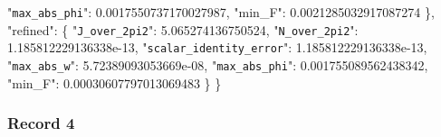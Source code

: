 \documentclass[
  10pt,
]{article}
\newenvironment{Shaded}{}{}
\newcommand{\DataTypeTok}[1]{\textcolor[rgb]{0.56,0.13,0.00}{#1}}
\newcommand{\FloatTok}[1]{\textcolor[rgb]{0.25,0.63,0.44}{#1}}
\newcommand{\FunctionTok}[1]{\textcolor[rgb]{0.02,0.16,0.49}{#1}}
\begin{document}
\begin{Shaded}
\begin{Highlighting}[]
    \DataTypeTok{"\nolinkurl{max_abs_phi}"}\FunctionTok{:} \FloatTok{0.0017550737170027987}\FunctionTok{,}
    \DataTypeTok{"min\_F"}\FunctionTok{:} \FloatTok{0.0021285032917087274}
  \FunctionTok{\},}
  \DataTypeTok{"refined"}\FunctionTok{:} \FunctionTok{\{}
    \DataTypeTok{"\nolinkurl{J_over_2pi2}"}\FunctionTok{:} \FloatTok{5.065274136750524}\FunctionTok{,}
    \DataTypeTok{"\nolinkurl{N_over_2pi2}"}\FunctionTok{:} \FloatTok{1.185812229136338e{-}13}\FunctionTok{,}
    \DataTypeTok{"\nolinkurl{scalar_identity_error}"}\FunctionTok{:} \FloatTok{1.185812229136338e{-}13}\FunctionTok{,}
    \DataTypeTok{"\nolinkurl{max_abs_w}"}\FunctionTok{:} \FloatTok{5.72389093053669e{-}08}\FunctionTok{,}
    \DataTypeTok{"\nolinkurl{max_abs_phi}"}\FunctionTok{:} \FloatTok{0.001755089562438342}\FunctionTok{,}
    \DataTypeTok{"min\_F"}\FunctionTok{:} \FloatTok{0.00030607797013069483}
  \FunctionTok{\}}
\FunctionTok{\}}
\end{Highlighting}
\end{Shaded}

\hypertarget{record-4-3}{%
\subsubsection{Record 4}\label{record-4-3}}
\end{document}
